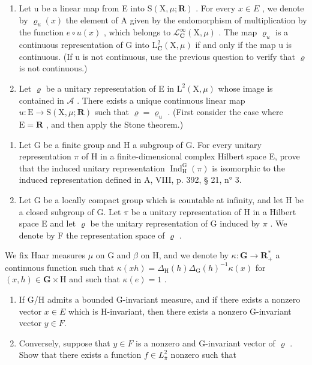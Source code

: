 \begin{enumerate}
\def\labelenumi{\alph{enumi})}
\setcounter{enumi}{1}
\item
  Let u be a linear map from E into \(\mathrm{S}(\mathrm{X},\mu;\mathbf{R})\) . For every \(x\in E\) , we denote by \(\varrho_{u}(x)\) the element of A given by the endomorphism of multiplication by the function \(e\circ u(x)\) , which belongs to \(\mathcal{L}_{\mathbf{C}}^{\infty}(\mathrm{X},\mu)\) . The map \(\varrho_{u}\) is a continuous representation of G into \(\mathrm{L}_{\mathbf{C}}^{2}(\mathrm{X},\mu)\) if and only if the map u is continuous. (If u is not continuous, use the previous question to verify that \(\varrho\) is not continuous.)
\item
  Let \(\varrho\) be a unitary representation of E in \(\mathrm{L}^2 (\mathrm{X},\mu)\) whose image is contained in \(\mathcal{A}\) . There exists a unique continuous linear map \(u\colon \mathrm{E}\to \mathrm{S}(\mathrm{X},\mu ;\mathbf{R})\) such that \(\varrho = \varrho_{u}\) . (First consider the case where \(\mathrm{E} = \mathbf{R}\) , and then apply the Stone theorem.)
\end{enumerate}

\begin{enumerate}
\def\labelenumi{\arabic{enumi})}
\setcounter{enumi}{18}
\item
  Let G be a finite group and H a subgroup of G. For every unitary representation \(\pi\) of H in a finite-dimensional complex Hilbert space E, prove that the induced unitary representation \(\operatorname{Ind}_{\mathrm{H}}^{\mathrm{G}}(\pi)\) is isomorphic to the induced representation defined in A, VIII, p. 392, § 21, n° 3.
\item
  Let G be a locally compact group which is countable at infinity, and let H be a closed subgroup of G. Let \(\pi\) be a unitary representation of H in a Hilbert space E and let \(\varrho\) be the unitary representation of G induced by \(\pi\) . We denote by F the representation space of \(\varrho\) .
\end{enumerate}

We fix Haar measures \(\mu\) on G and \(\beta\) on H, and we denote by \(\kappa\colon\mathbf{G}\to\mathbf{R}_{+}^{*}\) a continuous function such that \(\kappa(xh)=\Delta_{\mathrm{H}}(h)\Delta_{\mathrm{G}}(h)^{-1}\kappa(x)\) for \((x,h)\in\mathbf{G}\times\mathrm{H}\) and such that \(\kappa(e)=1\) .

\begin{enumerate}
\def\labelenumi{\alph{enumi})}
\item
  If G/H admits a bounded G-invariant measure, and if there exists a nonzero vector \(x \in E\) which is H-invariant, then there exists a nonzero G-invariant vector \(y \in F\).
\item
  Conversely, suppose that \(y \in F\) is a nonzero and G-invariant vector of \(\varrho\) . Show that there exists a function \(f \in L_{\overline{\pi}}^{2}\) nonzero such that
\end{enumerate}

